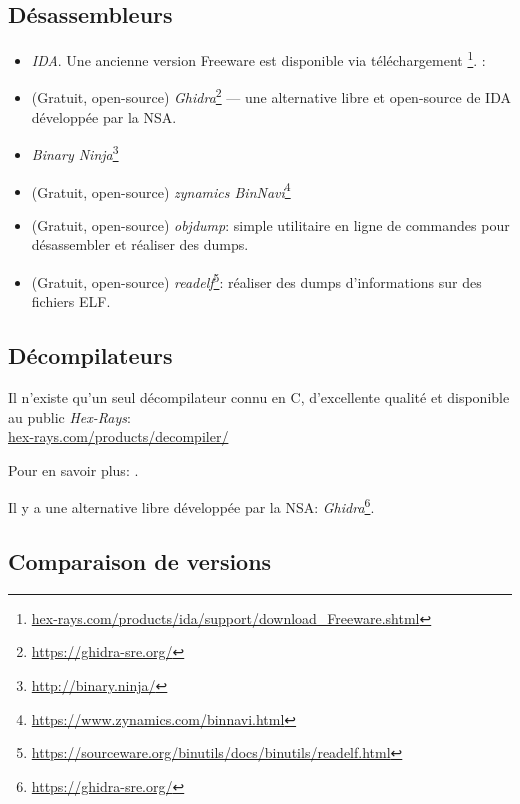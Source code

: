 \subsection{Désassembleurs}


\begin{itemize}
\item \emph{IDA}. Une ancienne version Freeware est disponible via téléchargement
\footnote{\href{http://www.hex-rays.com/idapro/idadownfreeware.htm}{hex-rays.com/products/ida/support/download\_Freeware.shtml}}.
\ShortHotKeyCheatsheet: 

\item (Gratuit, open-source) \emph{Ghidra}\footnote{\url{https://ghidra-sre.org/}} --- une alternative
	libre et open-source de IDA développée par la \ac{NSA}.

\item \emph{Binary Ninja}\footnote{\url{http://binary.ninja/}}

\item (Gratuit, open-source) \emph{zynamics BinNavi}\footnote{\url{https://www.zynamics.com/binnavi.html}}

\item (Gratuit, open-source) \emph{objdump}: simple utilitaire en ligne de commandes pour désassembler et réaliser des dumps.

\item (Gratuit, open-source) \emph{readelf}\footnote{\url{https://sourceware.org/binutils/docs/binutils/readelf.html}}:
réaliser des dumps d'informations sur des fichiers ELF.
\end{itemize}

\subsection{Décompilateurs}

Il n'existe qu'un seul décompilateur connu en C, d'excellente qualité et disponible au public \emph{Hex-Rays}:\\
\href{https://www.hex-rays.com/products/decompiler/}{hex-rays.com/products/decompiler/}

Pour en savoir plus: .

Il y a une alternative libre développée par la \ac{NSA}: \emph{Ghidra}\footnote{\url{https://ghidra-sre.org/}}.

\subsection{Comparaison de versions}

